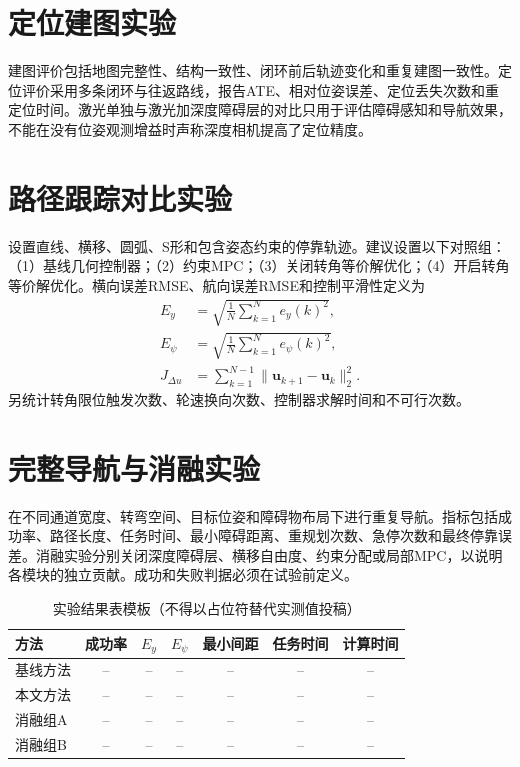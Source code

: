 \documentclass[UTF8,openany,12pt,a4paper]{ctexrep}
\begin{document}
\section{定位建图实验}
建图评价包括地图完整性、结构一致性、闭环前后轨迹变化和重复建图一致性。定位评价采用多条闭环与往返路线，报告ATE、相对位姿误差、定位丢失次数和重定位时间。激光单独与激光加深度障碍层的对比只用于评估障碍感知和导航效果，不能在没有位姿观测增益时声称深度相机提高了定位精度。

\section{路径跟踪对比实验}
设置直线、横移、圆弧、S形和包含姿态约束的停靠轨迹。建议设置以下对照组：（1）基线几何控制器；（2）约束MPC；（3）关闭转角等价解优化；（4）开启转角等价解优化。横向误差RMSE、航向误差RMSE和控制平滑性定义为
\begin{align}
E_y&=\sqrt{\frac{1}{N}\sum_{k=1}^{N}e_y(k)^2},\\
E_\psi&=\sqrt{\frac{1}{N}\sum_{k=1}^{N}e_\psi(k)^2},\\
J_{\Delta u}&=\sum_{k=1}^{N-1}\|\bm u_{k+1}-\bm u_k\|_2^2.
\end{align}
另统计转角限位触发次数、轮速换向次数、控制器求解时间和不可行次数。

\section{完整导航与消融实验}
在不同通道宽度、转弯空间、目标位姿和障碍物布局下进行重复导航。指标包括成功率、路径长度、任务时间、最小障碍距离、重规划次数、急停次数和最终停靠误差。消融实验分别关闭深度障碍层、横移自由度、约束分配或局部MPC，以说明各模块的独立贡献。成功和失败判据必须在试验前定义。

\begin{table}[H]\centering
\caption{实验结果表模板（不得以占位符替代实测值投稿）}
\begin{tabular}{lcccccc}
\toprule 方法 & 成功率 & $E_y$ & $E_\psi$ & 最小间距 & 任务时间 & 计算时间\\ \midrule
基线方法 & -- & -- & -- & -- & -- & --\\ 本文方法 & -- & -- & -- & -- & -- & --\\
消融组A & -- & -- & -- & -- & -- & --\\ 消融组B & -- & -- & -- & -- & -- & --\\ \bottomrule
\end{tabular}
\end{table}
\end{document}
